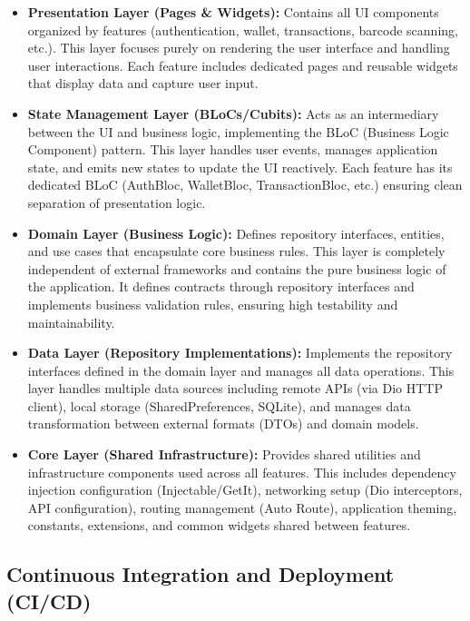 \begin{itemize}
    \item \textbf{Presentation Layer (Pages \& Widgets):} Contains all UI components organized by features (authentication, wallet, transactions, barcode scanning, etc.). This layer focuses purely on rendering the user interface and handling user interactions. Each feature includes dedicated pages and reusable widgets that display data and capture user input.
    
    \item \textbf{State Management Layer (BLoCs/Cubits):} Acts as an intermediary between the UI and business logic, implementing the BLoC (Business Logic Component) pattern. This layer handles user events, manages application state, and emits new states to update the UI reactively. Each feature has its dedicated BLoC (AuthBloc, WalletBloc, TransactionBloc, etc.) ensuring clean separation of presentation logic.
    
    \item \textbf{Domain Layer (Business Logic):} Defines repository interfaces, entities, and use cases that encapsulate core business rules. This layer is completely independent of external frameworks and contains the pure business logic of the application. It defines contracts through repository interfaces and implements business validation rules, ensuring high testability and maintainability.
    
    \item \textbf{Data Layer (Repository Implementations):} Implements the repository interfaces defined in the domain layer and manages all data operations. This layer handles multiple data sources including remote APIs (via Dio HTTP client), local storage (SharedPreferences, SQLite), and manages data transformation between external formats (DTOs) and domain models.
    
    \item \textbf{Core Layer (Shared Infrastructure):} Provides shared utilities and infrastructure components used across all features. This includes dependency injection configuration (Injectable/GetIt), networking setup (Dio interceptors, API configuration), routing management (Auto Route), application theming, constants, extensions, and common widgets shared between features.
\end{itemize}

\subsection{Continuous Integration and Deployment (CI/CD)}

